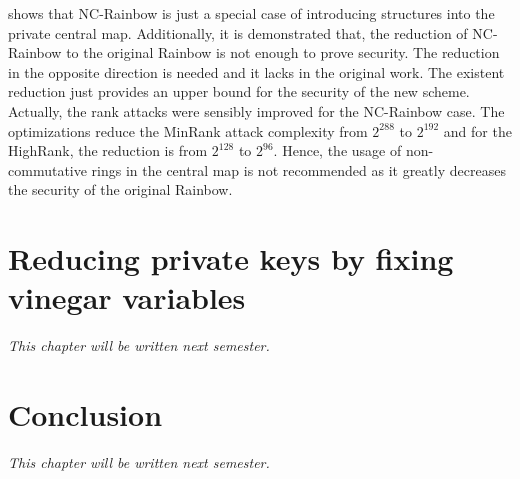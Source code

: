 \documentclass{ufsctex/ufsctex}
\begin{document}
\cite{thomae2012quo} shows that NC-Rainbow is just a special case of
introducing structures into the private central map. Additionally, it is
demonstrated that, the reduction of NC-Rainbow to the original Rainbow is not
enough to prove security. The reduction in the opposite direction is needed and
it lacks in the original work. The existent reduction just provides an upper
bound for the security of the new scheme. Actually, the rank attacks were
sensibly improved for the NC-Rainbow case. The optimizations reduce the MinRank
attack complexity from $2^{288}$ to $2^{192}$ and for the HighRank, the
reduction is from $2^{128}$ to $2^{96}$. Hence, the usage of non-commutative
rings in the central map is not recommended as it greatly decreases the
security of the original Rainbow.

\chapter{Reducing private keys by fixing vinegar variables}

\textit{This chapter will be written next semester.}

\chapter{Conclusion}

\textit{This chapter will be written next semester.}



\end{document}
